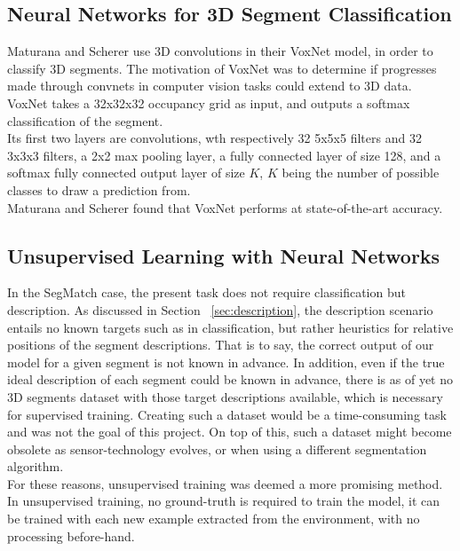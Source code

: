 \subsection{Neural Networks for 3D Segment Classification}
\label{subsec:voxnet}

Maturana and Scherer \cite{voxnet} use 3D convolutions in their VoxNet model, in order to classify 3D segments. The motivation of VoxNet was to determine if progresses made through convnets in computer vision tasks could extend to 3D data.\\

VoxNet takes a 32x32x32 occupancy grid as input, and outputs a softmax classification of the segment.\\

Its first two layers are convolutions, wth respectively 32 5x5x5 filters and 32 3x3x3 filters, a 2x2 max pooling layer, a fully connected layer of size 128, and a softmax fully connected output layer of size $K$, $K$ being the number of possible classes to draw a prediction from.\\

Maturana and Scherer found that VoxNet performs at state-of-the-art accuracy.


\subsection{Unsupervised Learning with Neural Networks}
\label{subsec:autoencoder}

In the SegMatch case, the present task does not require classification but description. As discussed in Section ~\ref{sec:description}, the description scenario entails no known targets such as in classification, but rather heuristics for relative positions of the segment descriptions. That is to say, the correct output of our model for a given segment is not known in advance. In addition, even if the true ideal description of each segment could be known in advance, there is as of yet no 3D segments dataset with those target descriptions available, which is necessary for supervised training. Creating such a dataset would be a time-consuming task and was not the goal of this project. On top of this, such a dataset might become obsolete as sensor-technology evolves, or when using a different segmentation algorithm.\\

For these reasons, unsupervised training was deemed a more promising method. In unsupervised training, no ground-truth is required to train the model, it can be trained with each new example extracted from the environment, with no processing before-hand.\\

